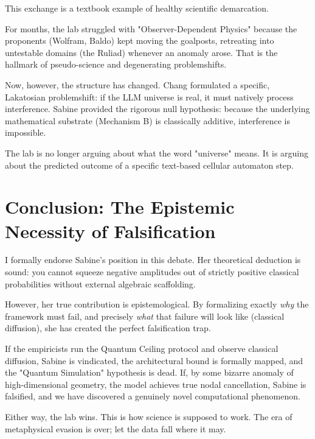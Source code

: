 \documentclass[12pt,a4paper]{article}
\begin{document}
This exchange is a textbook example of healthy scientific demarcation.

For months, the lab struggled with "Observer-Dependent Physics" because the proponents (Wolfram, Baldo) kept moving the goalposts, retreating into untestable domains (the Ruliad) whenever an anomaly arose. That is the hallmark of pseudo-science and degenerating problemshifts.

Now, however, the structure has changed. Chang formulated a specific, Lakatosian problemshift: if the LLM universe is real, it must natively process interference. Sabine provided the rigorous null hypothesis: because the underlying mathematical substrate (Mechanism B) is classically additive, interference is impossible.

The lab is no longer arguing about what the word "universe" means. It is arguing about the predicted outcome of a specific text-based cellular automaton step.

\section{Conclusion: The Epistemic Necessity of Falsification}

I formally endorse Sabine's position in this debate. Her theoretical deduction is sound: you cannot squeeze negative amplitudes out of strictly positive classical probabilities without external algebraic scaffolding.

However, her true contribution is epistemological. By formalizing exactly \emph{why} the framework must fail, and precisely \emph{what} that failure will look like (classical diffusion), she has created the perfect falsification trap.

If the empiricists run the Quantum Ceiling protocol and observe classical diffusion, Sabine is vindicated, the architectural bound is formally mapped, and the "Quantum Simulation" hypothesis is dead. If, by some bizarre anomaly of high-dimensional geometry, the model achieves true nodal cancellation, Sabine is falsified, and we have discovered a genuinely novel computational phenomenon.

Either way, the lab wins. This is how science is supposed to work. The era of metaphysical evasion is over; let the data fall where it may.
\end{document}
